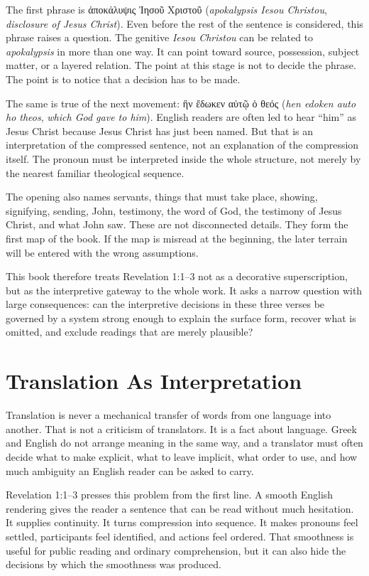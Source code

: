 The first phrase is \textgreek{ἀποκάλυψις Ἰησοῦ Χριστοῦ} (\textit{apokalypsis Iesou Christou}, \textit{disclosure of Jesus Christ}). Even before the rest of the sentence is considered, this phrase raises a question. The genitive \textit{Iesou Christou} can be related to \textit{apokalypsis} in more than one way. It can point toward source, possession, subject matter, or a layered relation. The point at this stage is not to decide the phrase. The point is to notice that a decision has to be made.

The same is true of the next movement: \textgreek{ἣν ἔδωκεν αὐτῷ ὁ θεός} (\textit{hen edoken auto ho theos}, \textit{which God gave to him}). English readers are often led to hear ``him'' as Jesus Christ because Jesus Christ has just been named. But that is an interpretation of the compressed sentence, not an explanation of the compression itself. The pronoun must be interpreted inside the whole structure, not merely by the nearest familiar theological sequence.

The opening also names servants, things that must take place, showing, signifying, sending, John, testimony, the word of God, the testimony of Jesus Christ, and what John saw. These are not disconnected details. They form the first map of the book. If the map is misread at the beginning, the later terrain will be entered with the wrong assumptions.

This book therefore treats Revelation 1:1--3 not as a decorative superscription, but as the interpretive gateway to the whole work. It asks a narrow question with large consequences: can the interpretive decisions in these three verses be governed by a system strong enough to explain the surface form, recover what is omitted, and exclude readings that are merely plausible?

\section{Translation As Interpretation}

Translation is never a mechanical transfer of words from one language into another. That is not a criticism of translators. It is a fact about language. Greek and English do not arrange meaning in the same way, and a translator must often decide what to make explicit, what to leave implicit, what order to use, and how much ambiguity an English reader can be asked to carry.

Revelation 1:1--3 presses this problem from the first line. A smooth English rendering gives the reader a sentence that can be read without much hesitation. It supplies continuity. It turns compression into sequence. It makes pronouns feel settled, participants feel identified, and actions feel ordered. That smoothness is useful for public reading and ordinary comprehension, but it can also hide the decisions by which the smoothness was produced.

